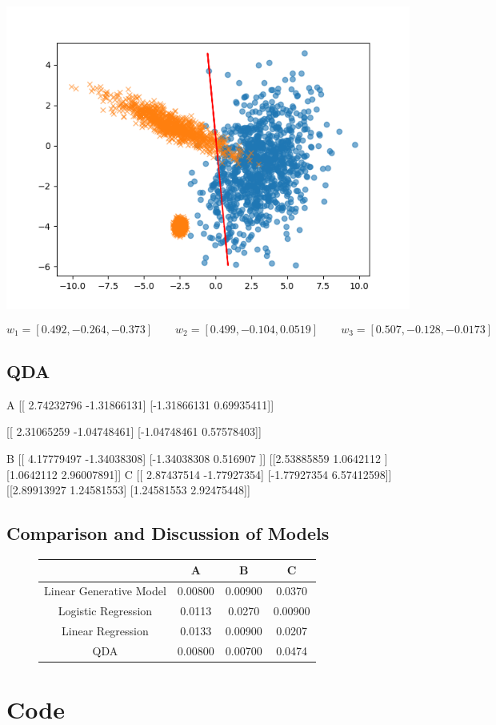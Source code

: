 \begin{center}
\includegraphics[height= 0.3\textheight]{LinearRegression2.png}
\end{center}

\begin{equation}
w_1 = [ 0.492, -0.264, -0.373] \qquad
w_2 = [ 0.499, -0.104,  0.0519] \qquad
w_3 = [ 0.507, -0.128, -0.0173]
\end{equation}
\clearpage

\subsection{QDA}
A
[[ 2.74232796 -1.31866131]
 [-1.31866131  0.69935411]] 

 [[ 2.31065259 -1.04748461]
 [-1.04748461  0.57578403]]


B
[[ 4.17779497 -1.34038308]
 [-1.34038308  0.516907  ]] [[2.53885859 1.0642112 ]
 [1.0642112  2.96007891]]
C
[[ 2.87437514 -1.77927354]
 [-1.77927354  6.57412598]] [[2.89913927 1.24581553]
 [1.24581553 2.92475448]]

\clearpage

\subsection{Comparison and Discussion of Models}
\begin{figure}[htbp!]
\begin{center}
\begin{tabular}{| c | c | c | c |}
\hline
&A & B & C\\
\hline
Linear Generative Model &0.00800& 0.00900 & 0.0370\\
\hline
Logistic Regression & 0.0113 &  0.0270 & 0.00900\\
\hline
Linear Regression & 0.0133 & 0.00900 & 0.0207\\
\hline
QDA & 0.00800  & 0.00700 & 0.0474 \\
\hline
\end{tabular}
\end{center}
\end{figure}

\clearpage
\section{Code}









